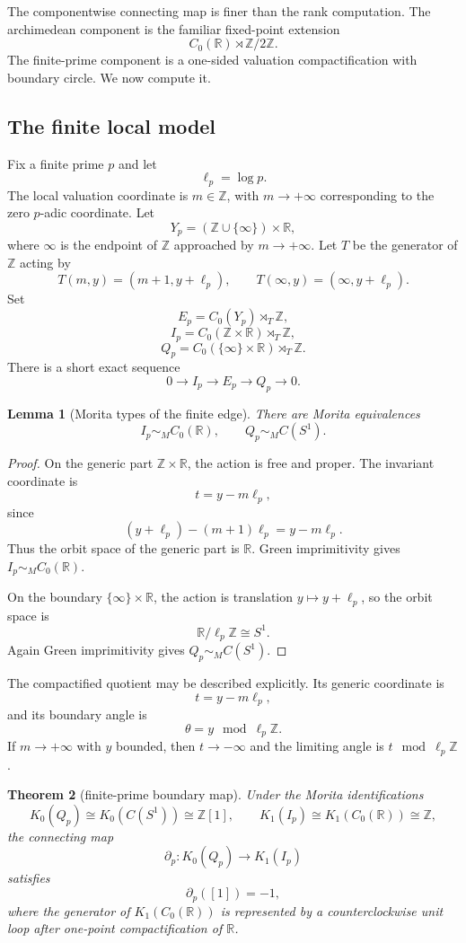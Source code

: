 \documentclass[11pt]{article}
\newtheorem{theorem}{Theorem}[section]
\newtheorem{lemma}[theorem]{Lemma}
\theoremstyle{remark}
\newcommand{\ZZ}{\mathbb Z}
\newcommand{\RR}{\mathbb R}
\begin{document}
The componentwise connecting map is finer than the rank computation.  The archimedean component is the familiar fixed-point extension
\[
        C_0(\RR)\rtimes\ZZ/2\ZZ.
\]
The finite-prime component is a one-sided valuation compactification with boundary circle.  We now compute it.

\subsection{The finite local model}

Fix a finite prime $p$ and let
\[
        \ell_p=\log p.
\]
The local valuation coordinate is $m\in\ZZ$, with $m\to+\infty$ corresponding to the zero $p$-adic coordinate.  Let
\[
        Y_p=(\ZZ\cup\{\infty\})\times\RR,
\]
where $\infty$ is the endpoint of $\ZZ$ approached by $m\to+\infty$.  Let $T$ be the generator of $\ZZ$ acting by
\[
        T(m,y)=(m+1,y+\ell_p),
        \qquad
        T(\infty,y)=(\infty,y+\ell_p).
\]
Set
\[
        E_p=C_0(Y_p)\rtimes_T\ZZ,
\]
\[
        I_p=C_0(\ZZ\times\RR)\rtimes_T\ZZ,
\]
\[
        Q_p=C_0(\{\infty\}\times\RR)\rtimes_T\ZZ.
\]
There is a short exact sequence
\[
        0\to I_p\to E_p\to Q_p\to0.
\]

\begin{lemma}[Morita types of the finite edge]
There are Morita equivalences
\[
        I_p\sim_M C_0(\RR),
        \qquad
        Q_p\sim_M C(S^1).
\]
\end{lemma}

\begin{proof}
On the generic part $\ZZ\times\RR$, the action is free and proper.  The invariant coordinate is
\[
        t=y-m\ell_p,
\]
since
\[
        (y+\ell_p)-(m+1)\ell_p=y-m\ell_p.
\]
Thus the orbit space of the generic part is $\RR$.  Green imprimitivity gives $I_p\sim_M C_0(\RR)$.

On the boundary $\{\infty\}\times\RR$, the action is translation $y\mapsto y+\ell_p$, so the orbit space is
\[
        \RR/\ell_p\ZZ\cong S^1.
\]
Again Green imprimitivity gives $Q_p\sim_M C(S^1)$.\end{proof}

The compactified quotient may be described explicitly.  Its generic coordinate is
\[
        t=y-m\ell_p,
\]
and its boundary angle is
\[
        \theta=y\mod \ell_p\ZZ.
\]
If $m\to+\infty$ with $y$ bounded, then $t\to-\infty$ and the limiting angle is $t\mod\ell_p\ZZ$.

\begin{theorem}[finite-prime boundary map]
Under the Morita identifications
\[
        K_0(Q_p)\cong K_0(C(S^1))\cong\ZZ[1],
        \qquad
        K_1(I_p)\cong K_1(C_0(\RR))\cong\ZZ,
\]
the connecting map
\[
        \partial_p:K_0(Q_p)\to K_1(I_p)
\]
satisfies
\[
        \partial_p([1])=-1,
\]
where the generator of $K_1(C_0(\RR))$ is represented by a counterclockwise unit loop after one-point compactification of $\RR$.
\end{theorem}
\end{document}
